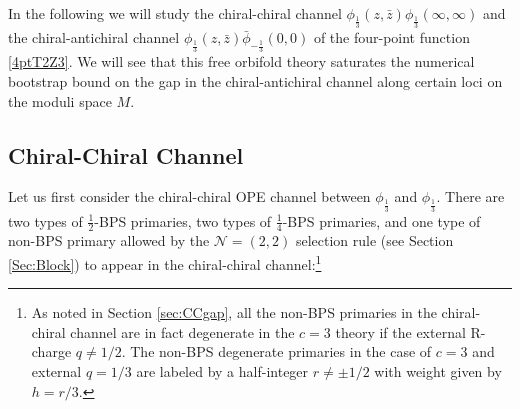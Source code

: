 \documentclass[12pt]{article}
\begin{document}
In the following we will study the chiral-chiral channel $ \phi_{\frac13} (z,\bar z) \phi_{\frac13} (\infty,\infty) $ and the  chiral-antichiral channel $ \phi_{\frac13} (z,\bar z)\bar \phi_{-\frac13} (0,0) $
of the four-point function \eqref{4ptT2Z3}.  We will see that this free orbifold theory saturates the numerical bootstrap bound on the gap in the chiral-antichiral channel along certain loci on the moduli space $M$.








\subsection{Chiral-Chiral Channel}\label{sec:CCT2Z3}


Let us first  consider the chiral-chiral OPE channel between $\phi_{\frac13}$ and $\phi_{\frac13}$.  There are two types of $\frac12$-BPS primaries, two types of $\frac14$-BPS primaries, and one type of non-BPS primary allowed by the $\mathcal{N}=(2,2)$ selection rule (see Section \ref{Sec:Block}) to appear in the chiral-chiral channel:\footnote{As noted in Section \ref{sec:CCgap}, all the non-BPS primaries in the chiral-chiral channel are in fact degenerate in the $c=3$ theory if the external R-charge $q\neq1/2$. The non-BPS degenerate primaries in the case of $c=3$ and external $q=1/3$ are labeled by a half-integer $r\neq \pm 1/2$ with weight given by $h=  r/3$.}
\end{document}
